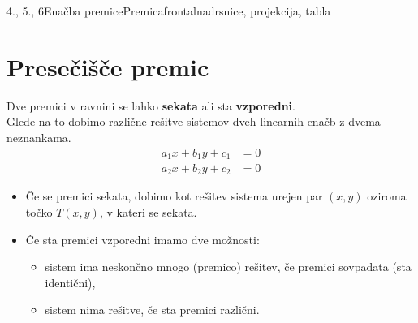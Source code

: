 \begin{priprava}{4., 5., 6}{}{Enačba premice}{Premica}{frontalna}{drsnice, projekcija, tabla}


\section{Presečišče premic}

                Dve premici v ravnini se lahko \textbf{sekata} ali sta \textbf{vzporedni}. \\ 
                Glede na to dobimo različne rešitve sistemov dveh linearnih enačb z dvema neznankama.
                $$\begin{aligned}
                    a_1x+b_1y+c_1&=0 \\ a_2x+b_2y+c_2&=0
                \end{aligned}$$
                
                \begin{itemize}
                    \item Če se premici sekata, dobimo kot rešitev sistema urejen par $(x,y)$ oziroma točko $T(x,y)$, v kateri se sekata.
                    \item Če sta premici vzporedni imamo dve možnosti:
                    \begin{itemize}
                        \item sistem ima neskončno mnogo (premico) rešitev, če premici sovpadata (sta identični),
                        \item sistem nima rešitve, če sta premici različni.
                    \end{itemize}
                \end{itemize}

~\\~\\


\end{priprava}
